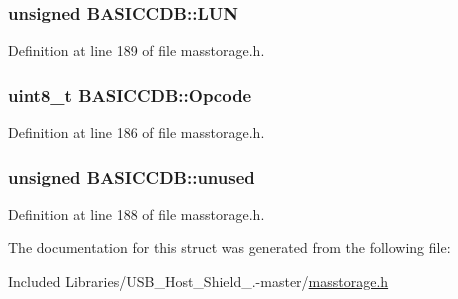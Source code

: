 \hypertarget{struct_b_a_s_i_c_c_d_b_a2cec985f2fd10576a004108c01d42fb4}{
\subsubsection[{\-L\-U\-N}]{\setlength{\rightskip}{0pt plus 5cm}unsigned {\bf \-B\-A\-S\-I\-C\-C\-D\-B\-::\-L\-U\-N}}}\label{struct_b_a_s_i_c_c_d_b_a2cec985f2fd10576a004108c01d42fb4}


\-Definition at line 189 of file masstorage.\-h.

\hypertarget{struct_b_a_s_i_c_c_d_b_a64d8bea0216a84b8ba8c8f411ceae2c3}{
\subsubsection[{\-Opcode}]{\setlength{\rightskip}{0pt plus 5cm}uint8\-\_\-t {\bf \-B\-A\-S\-I\-C\-C\-D\-B\-::\-Opcode}}}\label{struct_b_a_s_i_c_c_d_b_a64d8bea0216a84b8ba8c8f411ceae2c3}


\-Definition at line 186 of file masstorage.\-h.

\hypertarget{struct_b_a_s_i_c_c_d_b_a2c6031f3dde94acd5d03c80db213c534}{
\subsubsection[{unused}]{\setlength{\rightskip}{0pt plus 5cm}unsigned {\bf \-B\-A\-S\-I\-C\-C\-D\-B\-::unused}}}\label{struct_b_a_s_i_c_c_d_b_a2c6031f3dde94acd5d03c80db213c534}


\-Definition at line 188 of file masstorage.\-h.



\-The documentation for this struct was generated from the following file\-:\begin{DoxyCompactItemize}
\item 
\-Included Libraries/\-U\-S\-B\-\_\-\-Host\-\_\-\-Shield\-\_.-\/master/\hyperlink{masstorage_8h}{masstorage.\-h}\end{DoxyCompactItemize}
